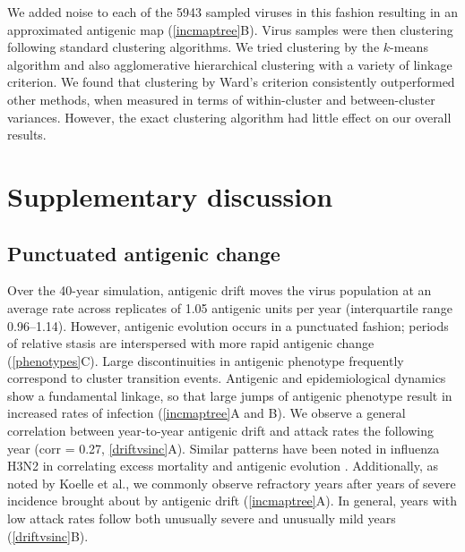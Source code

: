We added noise to each of the 5943 sampled viruses in this fashion resulting in an approximated antigenic map (\ref{incmaptree}B).  Virus samples were then clustering following standard clustering algorithms.  We tried clustering by the $k$-means algorithm and also agglomerative hierarchical clustering with a variety of linkage criterion.  We found that clustering by Ward's criterion consistently outperformed other methods, when measured in terms of within-cluster and between-cluster variances.  However, the exact clustering algorithm had little effect on our overall results.

\section*{Supplementary discussion}

\subsection*{Punctuated antigenic change}

Over the  40-year simulation, antigenic drift moves the virus population at an average rate across replicates of 1.05 antigenic units per year (interquartile range 0.96--1.14).  However, antigenic evolution occurs in a punctuated fashion; periods of relative stasis are interspersed with more rapid antigenic change (\ref{phenotypes}C).  Large discontinuities in antigenic phenotype frequently correspond to cluster transition events.  Antigenic and epidemiological dynamics show a fundamental linkage, so that large jumps of antigenic phenotype result in increased rates of infection (\ref{incmaptree}A and B).  We observe a general correlation between year-to-year antigenic drift and attack rates the following year (corr = 0.27, \ref{driftvsinc}A).  Similar patterns have been noted in influenza H3N2 in correlating excess mortality and antigenic evolution \cite{Wu10}.  Additionally, as noted by Koelle et al.\cite{Koelle06}, we commonly observe refractory years after years of severe incidence brought about by antigenic drift (\ref{incmaptree}A).  In general, years with low attack rates follow both unusually severe and unusually mild years (\ref{driftvsinc}B).  

